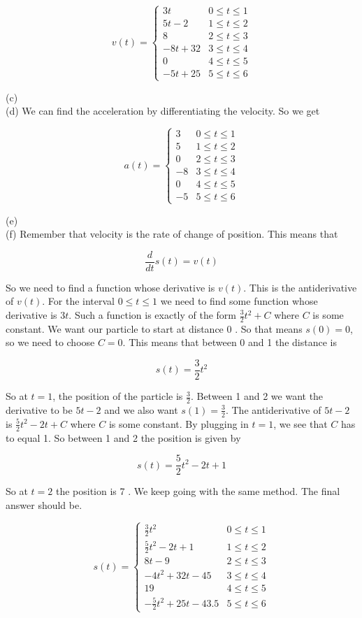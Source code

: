\documentclass[10pt]{article}
\begin{document}
$$
v(t)= \begin{cases}3 t & 0 \leq t \leq 1 \\ 5 t-2 & 1 \leq t \leq 2 \\ 8 & 2 \leq t \leq 3 \\ -8 t+32 & 3 \leq t \leq 4 \\ 0 & 4 \leq t \leq 5 \\ -5 t+25 & 5 \leq t \leq 6\end{cases}
$$

(c)\\
(d) We can find the acceleration by differentiating the velocity. So we get

$$
a(t)= \begin{cases}3 & 0 \leq t \leq 1 \\ 5 & 1 \leq t \leq 2 \\ 0 & 2 \leq t \leq 3 \\ -8 & 3 \leq t \leq 4 \\ 0 & 4 \leq t \leq 5 \\ -5 & 5 \leq t \leq 6\end{cases}
$$

(e)\\
(f) Remember that velocity is the rate of change of position. This means that

$$
\frac{d}{d t} s(t)=v(t)
$$

So we need to find a function whose derivative is $v(t)$. This is the antiderivative of $v(t)$. For the interval $0 \leq t \leq 1$ we need to find some function whose derivative is $3 t$. Such a function is exactly of the form $\frac{3}{2} t^{2}+C$ where $C$ is some constant. We want our particle to start at distance 0 . So that means $s(0)=0$, so we need to choose $C=0$. This means that between 0 and 1 the distance is

$$
s(t)=\frac{3}{2} t^{2}
$$

So at $t=1$, the position of the particle is $\frac{3}{2}$. Between 1 and 2 we want the derivative to be $5 t-2$ and we also want $s(1)=\frac{3}{2}$. The antiderivative of $5 t-2$ is $\frac{5}{2} t^{2}-2 t+C$ where $C$ is some constant. By plugging in $t=1$, we see that $C$ has to equal 1. So between 1 and 2 the position is given by

$$
s(t)=\frac{5}{2} t^{2}-2 t+1
$$

So at $t=2$ the position is 7 . We keep going with the same method. The final answer should be.

$$
s(t)= \begin{cases}\frac{3}{2} t^{2} & 0 \leq t \leq 1 \\ \frac{5}{2} t^{2}-2 t+1 & 1 \leq t \leq 2 \\ 8 t-9 & 2 \leq t \leq 3 \\ -4 t^{2}+32 t-45 & 3 \leq t \leq 4 \\ 19 & 4 \leq t \leq 5 \\ -\frac{5}{2} t^{2}+25 t-43.5 & 5 \leq t \leq 6\end{cases}
$$
\end{document}
